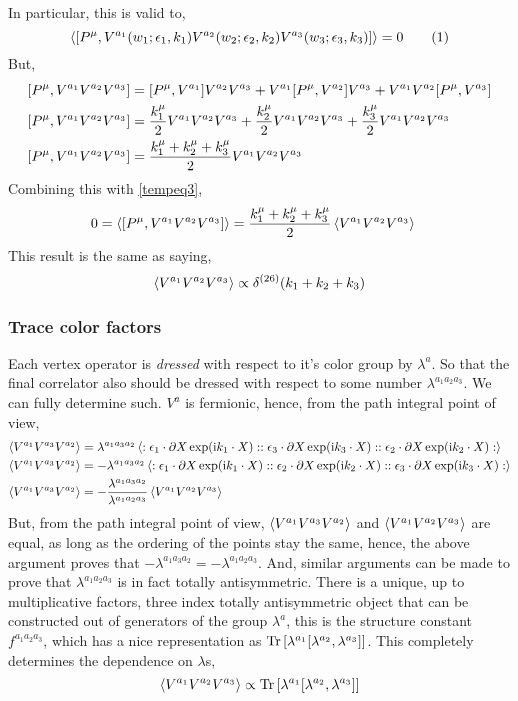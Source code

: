 In particular, this is valid to,
\[\expval{\comm{P ^\mu}{V^{a_1}\qty(w_1;\epsilon_1,k_1)V^{a_2}\qty(w_2;\epsilon_2,k_2)V^{a_3}\qty(w_3;\epsilon_3,k_3)}}=0\numberthis\label{tempeq3}\]
But,
\begin{align*}
    \comm{P ^\mu}{V^{a_1}V^{a_2}V^{a_3}}&=\comm{P ^\mu}{V^{a_1}}V^{a_2}V^{a_3}+V^{a_1}\comm{P ^\mu}{V^{a_2}}V^{a_3}+V^{a_1}V^{a_2}\comm{P ^\mu}{V^{a_3}}\\
    \comm{P ^\mu}{V^{a_1}V^{a_2}V^{a_3}}&=\frac{k_1^\mu}{2}V^{a_1}V^{a_2}V^{a_3}+\frac{k_2^\mu}{2}V^{a_1}V^{a_2}V^{a_3}+\frac{k_3^\mu}{2}V^{a_1}V^{a_2}V^{a_3}\\
    \comm{P ^\mu}{V^{a_1}V^{a_2}V^{a_3}}&=\frac{k_1^\mu+k_2^\mu+k_3^\mu}{2}V^{a_1}V^{a_2}V^{a_3}
\end{align*}
Combining this with \cref{tempeq3},
\begin{align*}
    0&=\expval{\comm{P ^\mu}{V^{a_1}V^{a_2}V^{a_3}}}=\frac{k_1^\mu+k_2^\mu+k_3^\mu}{2}\expval{V^{a_1}V^{a_2}V^{a_3}}
\end{align*}
This result is the same as saying,\[\expval{V^{a_1}V^{a_2}V^{a_3}}\propto\delta^{\qty(26)}\qty(k_1+k_2+k_3)\]

\subsubsection{Trace color factors}

Each vertex operator is \textit{dressed} with respect to it's color group by $\lambda^a$. 
So that the final correlator also should be dressed with respect to some number $\lambda^{a_1a_2a_3}$. 
We can fully determine such. $V^a$ is fermionic, hence, from the path integral point of view,
\begin{align*}
    \expval{V^{a_1}V^{a_3}V^{a_2}}&=\lambda^{a_1a_3a_2}\expval{:\epsilon_1\cdot \partial X\exp(\textnormal{i}k_1\cdot X)::\epsilon_3\cdot \partial X\exp(\textnormal{i}k_3\cdot X)::\epsilon_2\cdot \partial X\exp(\textnormal{i}k_2\cdot X):}\\
    \expval{V^{a_1}V^{a_3}V^{a_2}}&=-\lambda^{a_1a_3a_2}\expval{:\epsilon_1\cdot \partial X\exp(\textnormal{i}k_1\cdot X)::\epsilon_2\cdot \partial X\exp(\textnormal{i}k_2\cdot X)::\epsilon_3\cdot \partial X\exp(\textnormal{i}k_3\cdot X):}\\
    \expval{V^{a_1}V^{a_3}V^{a_2}}&=-\frac{\lambda^{a_1a_3a_2}}{\lambda^{a_1a_2a_3}}\expval{V^{a_1}V^{a_2}V^{a_3}}
\end{align*}
But, from the path integral point of view, $\expval{V^{a_1}V^{a_3}V^{a_2}}$ and $\expval{V^{a_1}V^{a_2}V^{a_3}}$ are equal, as long as 
the ordering of the points stay the same, hence, the above argument proves that $-\lambda^{a_1a_3a_2}=-\lambda^{a_1a_2a_3}$. 
And, similar arguments can be made to prove that $\lambda^{a_1a_2a_3}$ is in fact totally antisymmetric. There is a unique, 
up to multiplicative factors, three index totally antisymmetric object that can be constructed out of generators of the group $\lambda^a$, 
this is the structure constant $f^{a_1a_2a_3}$, which has a nice representation as $\Tr\qty[\lambda^{a_1}\comm{\lambda^{a_2}}{\lambda^{a_3}}]$. 
This completely determines the dependence on $\lambda$s,
\[\expval{V^{a_1}V^{a_2}V^{a_3}}\propto\Tr\qty[\lambda^{a_1}\comm{\lambda^{a_2}}{\lambda^{a_3}}]\]

